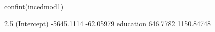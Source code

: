 \begin{Schunk}
\begin{Sinput}
 confint(incedmod1)
\end{Sinput}
\begin{Soutput}
                 2.5 %     97.5 %
(Intercept) -5645.1114  -62.05979
education     646.7782 1150.84748
\end{Soutput}
\end{Schunk}
